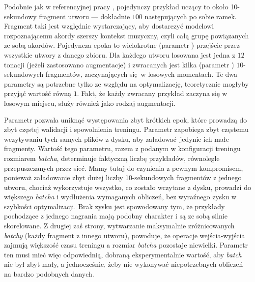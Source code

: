 Podobnie jak w referencyjnej pracy \cite{park_bi-directional_2019}, pojedynczy przykład uczący to około 10-sekundowy fragment utworu --- dokładnie $100$ następujących po sobie ramek. Fragment taki jest względnie wystarczający, aby dostarczyć modelowi rozpoznającemu akordy szerszy kontekst muzyczny, czyli całą grupę powiązanych ze sobą akordów. Pojedyncza epoka to wielokrotne (parametr ) przejście przez wszystkie utwory z danego zbioru. Dla każdego utworu losowana jest jedna z $12$ tonacji (jeżeli zastosowano augmentacje) i zwracanych jest kilka (parametr ) $10$-sekundowych fragmentów, zaczynających się w losowych momentach. Te dwa parametry są potrzebne tylko ze względu na optymalizację, teoretycznie mogłyby przyjąć wartość równą $1$. Fakt, że każdy zwracany przykład zaczyna się w losowym miejscu, służy również jako rodzaj augmentacji.

Parametr  pozwala uniknąć występowania zbyt krótkich epok, które prowadzą do zbyt częstej walidacji i spowolnienia treningu. Parametr  zapobiega zbyt częstemu wczytywaniu tych samych plików z dysku, aby załadować jedynie ich małe fragmenty. Wartość tego parametru, razem z podanym w konfiguracji treningu rozmiarem \emph{batcha}, determinuje faktyczną liczbę przykładów, równolegle przepuszczanych przez sieć. Mamy tutaj do czynienia z pewnym kompromisem, ponieważ załadowanie zbyt dużej liczby 10-sekundowych fragmentów z jednego utworu, chociaż wykorzystuje wszystko, co zostało wczytane z dysku, prowadzi do większego \emph{batcha} i wydłużenia wymaganych obliczeń, bez wyraźnego zysku w szybkości optymalizacji. Brak zysku jest spowodowany tym, że przykłady pochodzące z jednego nagrania mają podobny charakter i są ze sobą silnie skorelowane. Z drugiej zaś strony, wytwarzanie maksymalnie zróżnicowanych \emph{batchy} (każdy fragment z innego utworu), powoduje, że operacje wejścia-wyjścia zajmują większość czasu treningu a rozmiar \emph{batcha} pozostaje niewielki.  Parametr ten musi mieć więc odpowiednią, dobraną eksperymentalnie wartość, aby \emph{batch} nie był zbyt mały, a jednocześnie, żeby nie wykonywać niepotrzebnych obliczeń na bardzo podobnych danych.

